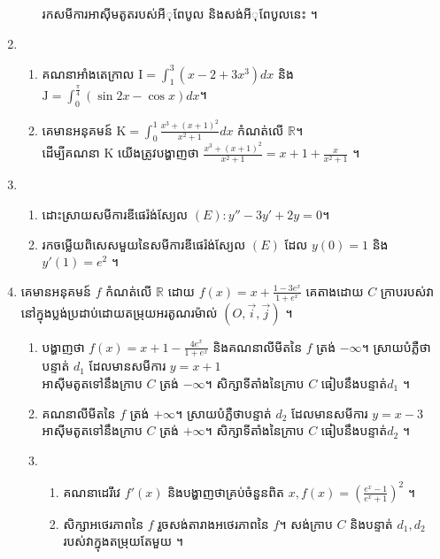 \documentclass{officialexam}
\begin{document}
\begin{enumerate}[I]
\begin{enumerate}[1]
		រកសមីការអាស៊ីមតូតរបស់អីុពែបូល និងសង់អីុពែបូលនេះ ។
	\end{enumerate}
	\item \begin{enumerate}[1]
		\item គណនាអាំងតេក្រាល $\mathrm{I}=\int_{1}^{3}\left(x-2+3x^3\right)dx$ និង $\mathrm{J}=\int_{0}^{\frac{\pi}{4}}\left(\sin2x-\cos x\right)dx$។ 
		\item  គេមានអនុគមន៍ $\mathrm{K}=\int_{0}^{1}\frac{x^3+\left(x+1\right)^2}{x^2+1}dx$ កំណត់លើ $\mathbb{R}$។\\ 
		ដើម្បីគណនា $\mathrm{K}$ យើងត្រូវបង្ហាញថា $\frac{x^3+\left(x+1\right)^2}{x^2+1}=x+1+\frac{x}{x^2+1}$ ។
	\end{enumerate}
	\item \begin{enumerate}[k]
		\item ដោះស្រាយសមីការឌីផេរ៉ង់ស្យែល $(E): y''-3y'+2y=0$។
		\item រកចម្លើយពិសេសមួយនៃសមីការឌីផេរ៉ង់ស្យែល $(E)$ ដែល $y(0)=1$ និង $y'(1)=e^2$ ។
	\end{enumerate}
	\item គេមានអនុគមន៍ $f$ កំណត់លើ $\mathbb{R}$ ដោយ $f(x)=x+\frac{1-3e^x}{1+e^x}$ គេតាងដោយ $C$ ក្រាបរបស់វានៅក្នុងប្លង់ប្រដាប់ដោយតម្រុយអរតូណរម៉ាល់ $\left(O, \vec{i}, \vec{j}\right)$ ។
	\begin{enumerate}[1]
		\item បង្ហាញថា $f(x)=x+1-\frac{4e^x}{1+e^x}$ និងគណនាលីមីតនៃ $f$ ត្រង់ $-\infty$។ ស្រាយបំភ្លឺថាបន្ទាត់ $d_1$ ដែលមានសមីការ $y=x+1$\\ អាស៊ីមតូតទៅនឹងក្រាប $C$ ត្រង់ $-\infty$។ សិក្សាទីតាំងនៃក្រាប $C$ ធៀបនឹងបន្ទាត់​ $d_1$ ។
		\item គណនាលីមីតនៃ $f$ ត្រង់ $+\infty$។ ស្រាយបំភ្លឺថាបន្ទាត់ $d_2$ ដែលមានសមីការ $y=x-3$\\ អាស៊ីមតូតទៅនឹងក្រាប $C$ ត្រង់ $+\infty$។ សិក្សាទីតាំងនៃក្រាប $C$ ធៀបនឹងបន្ទាត់​ $d_2$ ។
		\item 
		\begin{enumerate}[k]
			\item គណនាដេរីវេ $f'(x)$ និងបង្ហាញថាគ្រប់ចំនួនពិត $x, f(x)=\left(\frac{e^x-1}{e^x+1}\right)^2$ ។
			\item សិក្សាអថេរភាពនៃ $f$ រួចសង់តារាងអថេរភាពនៃ $f$។ សង់ក្រាប $C$ និងបន្ទាត់ $d_1, d_2$ របស់វាក្នុងតម្រុយតែមួយ ។
		\end{enumerate}
	\end{enumerate}
\end{enumerate}
\\
\end{document}

